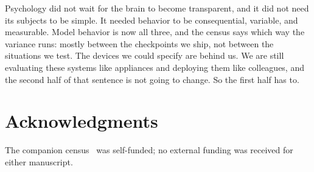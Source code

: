 \documentclass[journal]{IEEEtran}
\begin{document}
Psychology did not wait for the brain to become transparent, and it
did not need its subjects to be simple. It needed behavior to be
consequential, variable, and measurable. Model behavior is now all
three, and the census says which way the variance runs: mostly
between the checkpoints we ship, not between the situations we test.
The devices we could specify are behind us. We are still evaluating
these systems like appliances and deploying them like colleagues, and
the second half of that sentence is not going to change. So the first
half has to.

\section*{Acknowledgments}
The companion census~\cite{aksu2026census} was self-funded; no
external funding was received for either manuscript.



\end{document}
